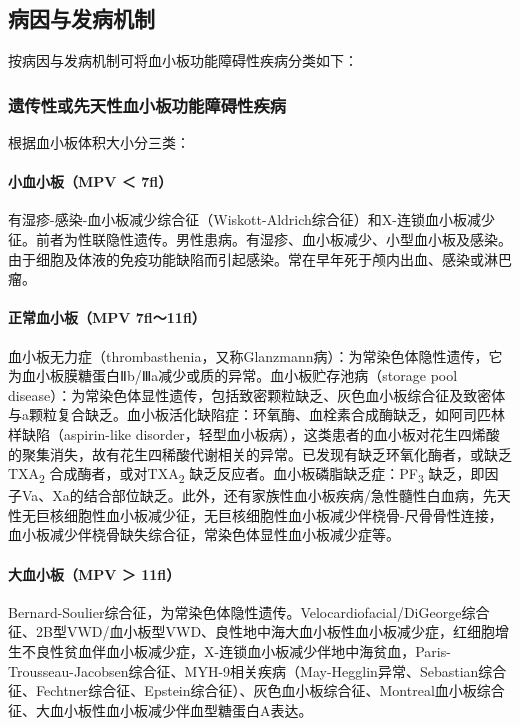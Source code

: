 \subsection{病因与发病机制}

按病因与发病机制可将血小板功能障碍性疾病分类如下：

\subsubsection{遗传性或先天性血小板功能障碍性疾病}

根据血小板体积大小分三类：

\paragraph{小血小板（MPV ＜ 7fl）}

有湿疹-感染-血小板减少综合征（Wiskott-Aldrich综合征）和X-连锁血小板减少征。前者为性联隐性遗传。男性患病。有湿疹、血小板减少、小型血小板及感染。由于细胞及体液的免疫功能缺陷而引起感染。常在早年死于颅内出血、感染或淋巴瘤。

\paragraph{正常血小板（MPV 7fl～11fl）}

血小板无力症（thrombasthenia，又称Glanzmann病）：为常染色体隐性遗传，它为血小板膜糖蛋白Ⅱb/Ⅲa减少或质的异常。血小板贮存池病（storage
pool
disease）：为常染色体显性遗传，包括致密颗粒缺乏、灰色血小板综合征及致密体与a颗粒复合缺乏。血小板活化缺陷症：环氧酶、血栓素合成酶缺乏，如阿司匹林样缺陷（aspirin-like
disorder，轻型血小板病），这类患者的血小板对花生四烯酸的聚集消失，故有花生四稀酸代谢相关的异常。已发现有缺乏环氧化酶者，或缺乏TXA\textsubscript{2}
合成酶者，或对TXA\textsubscript{2}
缺乏反应者。血小板磷脂缺乏症：PF\textsubscript{3}
缺乏，即因子Va、Xa的结合部位缺乏。此外，还有家族性血小板疾病/急性髓性白血病，先天性无巨核细胞性血小板减少征，无巨核细胞性血小板减少伴桡骨-尺骨骨性连接，血小板减少伴桡骨缺失综合征，常染色体显性血小板减少症等。

\paragraph{大血小板（MPV ＞ 11fl）}

Bernard-Soulier综合征，为常染色体隐性遗传。Velocardiofacial/DiGeorge综合征、2B型VWD/血小板型VWD、良性地中海大血小板性血小板减少症，红细胞增生不良性贫血伴血小板减少症，X-连锁血小板减少伴地中海贫血，Paris-Trousseau-Jacobsen综合征、MYH-9相关疾病（May-Hegglin异常、Sebastian综合征、Fechtner综合征、Epstein综合征）、灰色血小板综合征、Montreal血小板综合征、大血小板性血小板减少伴血型糖蛋白A表达。

